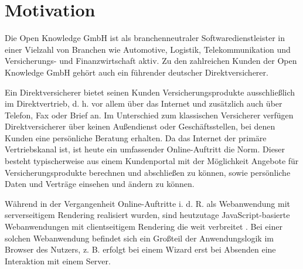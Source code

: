 
\section{Motivation}


Die Open Knowledge GmbH ist als branchenneutraler Softwaredienstleister in einer Vielzahl von Branchen wie Automotive, Logistik, Telekommunikation und Versicherungs- und Finanzwirtschaft aktiv. Zu den zahlreichen Kunden der Open Knowledge GmbH gehört auch ein führender deutscher Direktversicherer. 

Ein Direktversicherer bietet seinen Kunden Versicherungsprodukte ausschließlich im Direktvertrieb, d. h. vor allem über das Internet und zusätzlich auch über Telefon, Fax oder Brief an. Im Unterschied zum klassischen Versicherer verfügen Direktversicherer über keinen Außendienst oder Geschäftsstellen, bei denen Kunden eine persönliche Beratung erhalten. Da das Internet der primäre Vertriebskanal ist, ist heute ein umfassender Online-Auftritt die Norm. Dieser besteht typischerweise aus einem Kundenportal mit der Möglichkeit Angebote für Versicherungsprodukte berechnen und abschließen zu können, sowie persönliche Daten und Verträge einsehen und ändern zu können.


Während in der Vergangenheit Online-Auftritte i. d. R. als Webanwendung mit serverseitigem Rendering realisiert wurden, sind heutzutage JavaScript-basierte Webanwendungen mit clientseitigem Rendering die weit verbreitet \cite{ShiftToClientSideWebApplications}. Bei einer solchen Webanwendung befindet sich ein Großteil der Anwendungslogik im Browser des Nutzers, z. B. erfolgt bei einem Wizard erst bei Absenden eine Interaktion mit einem Server.

